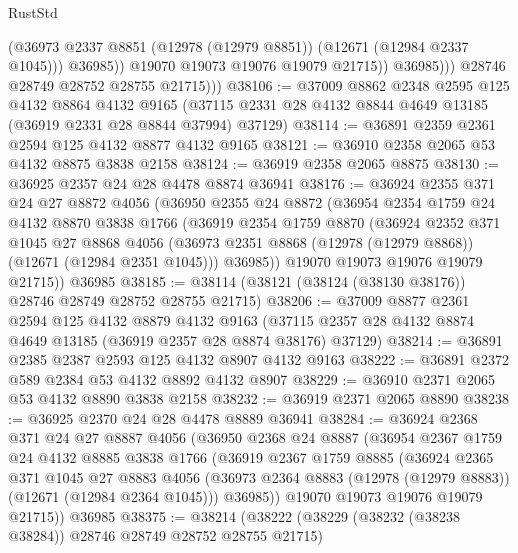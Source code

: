 \begin{lexlean}{RustStd}
\begin{coremodule}
                        (@36973 @2337 @8851 (@12978 (@12979 @8851)) (@12671 (@12984 @2337 @1045)))
                        @36985))
                    @19070
                    @19073
                    @19076
                    @19079
                    @21715))
                @36985)))
          @28746
          @28749
          @28752
          @28755
          @21715)))
@38106 := @37009
    @8862
    @2348
    @2595
    @125
    @4132
    @8864
    @4132
    @9165
    (@37115 @2331 @28 @4132 @8844 @4649 @13185 (@36919 @2331 @28 @8844 @37994) @37129)
@38114 := @36891 @2359 @2361 @2594 @125 @4132 @8877 @4132 @9165
@38121 := @36910 @2358 @2065 @53 @4132 @8875 @3838 @2158
@38124 := @36919 @2358 @2065 @8875
@38130 := @36925 @2357 @24 @28 @4478 @8874 @36941
@38176 := @36924
    @2355
    @371
    @24
    @27
    @8872
    @4056
    (@36950
      @2355
      @24
      @8872
      (@36954
        @2354
        @1759
        @24
        @4132
        @8870
        @3838
        @1766
        (@36919
          @2354
          @1759
          @8870
          (@36924
            @2352
            @371
            @1045
            @27
            @8868
            @4056
            (@36973 @2351 @8868 (@12978 (@12979 @8868)) (@12671 (@12984 @2351 @1045)))
            @36985))
        @19070
        @19073
        @19076
        @19079
        @21715))
    @36985
@38185 := @38114 (@38121 (@38124 (@38130 @38176)) @28746 @28749 @28752 @28755 @21715)
@38206 := @37009
    @8877
    @2361
    @2594
    @125
    @4132
    @8879
    @4132
    @9163
    (@37115 @2357 @28 @4132 @8874 @4649 @13185 (@36919 @2357 @28 @8874 @38176) @37129)
@38214 := @36891 @2385 @2387 @2593 @125 @4132 @8907 @4132 @9163
@38222 := @36891 @2372 @589 @2384 @53 @4132 @8892 @4132 @8907
@38229 := @36910 @2371 @2065 @53 @4132 @8890 @3838 @2158
@38232 := @36919 @2371 @2065 @8890
@38238 := @36925 @2370 @24 @28 @4478 @8889 @36941
@38284 := @36924
    @2368
    @371
    @24
    @27
    @8887
    @4056
    (@36950
      @2368
      @24
      @8887
      (@36954
        @2367
        @1759
        @24
        @4132
        @8885
        @3838
        @1766
        (@36919
          @2367
          @1759
          @8885
          (@36924
            @2365
            @371
            @1045
            @27
            @8883
            @4056
            (@36973 @2364 @8883 (@12978 (@12979 @8883)) (@12671 (@12984 @2364 @1045)))
            @36985))
        @19070
        @19073
        @19076
        @19079
        @21715))
    @36985
@38375 := @38214
    (@38222
      (@38229 (@38232 (@38238 @38284)) @28746 @28749 @28752 @28755 @21715)

\end{coremodule}
\end{lexlean}
